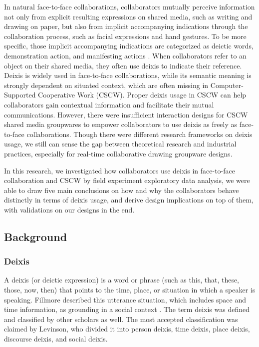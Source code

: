 \documentclass[12pt,twoside]{article}
\begin{document}


In natural face-to-face collaborations, collaborators mutually perceive information not only from explicit resulting expressions on shared media, such as writing and drawing on paper, but also from implicit accompanying indications through the collaboration process, such as facial expressions and hand gestures. To be more specific, those implicit accompanying indications are categorized as deictic words, demonstration action, and manifesting actions \cite{gutwin2002descriptive}. When collaborators refer to an object on their shared media, they often use deixis to indicate their reference. Deixis is widely used in face-to-face collaborations, while its semantic meaning is strongly dependent on situated context, which are often missing in Computer-Supported Cooperative Work (CSCW). Proper deixis usage in CSCW can help collaborators gain contextual information and facilitate their mutual communications. However, there were insufficient interaction designs for CSCW shared media groupwares to empower collaborators to use deixis as freely as face-to-face collaborations. Though there were different research frameworks on deixis usage, we still can sense the gap between theoretical research and industrial practices, especially for real-time collaborative drawing groupware designs.

In this research, we investigated how collaborators use deixis in face-to-face collaboration and CSCW by field experiment exploratory data analysis, we were able to draw five main conclusions on how and why the collaborators behave distinctly in terms of deixis usage, and derive design implications on top of them, with validations on our designs in the end.

\subsection{Background}
\label{sect:literature}
\subsubsection{Deixis}
A deixis (or deictic expression) is a word or phrase (such as this, that, these, those, now, then) that points to the time, place, or situation in which a speaker is speaking. Fillmore described this utterance situation, which includes space and time information,  as grounding in a social context \cite{fillmore1997lectures}. The term deixis was defined and classified by other scholars as well. The most accepted classification was claimed by Levinson, who divided it into person deixis, time deixis, place deixis, discourse deixis, and social deixis.
\end{document}
